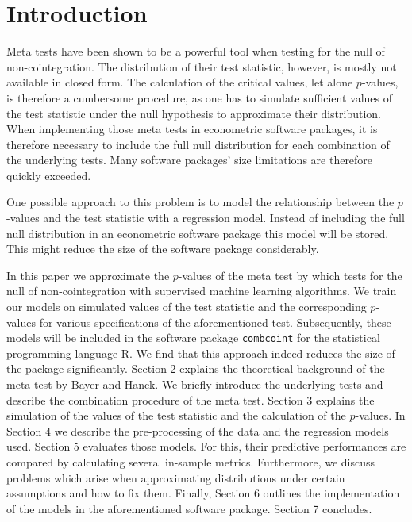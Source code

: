 \documentclass[12pt,a4paper]{article}
\begin{document}
\restoregeometry

\newpage
{} %

\hypertarget{introduction}{%
\section{Introduction}\label{introduction}}

Meta tests have been shown to be a powerful tool when testing for the
null of non-cointegration. The distribution of their test statistic,
however, is mostly not available in closed form. The calculation of the
critical values, let alone \(p\)-values, is therefore a cumbersome
procedure, as one has to simulate sufficient values of the test
statistic under the null hypothesis to approximate their distribution.
When implementing those meta tests in econometric software packages, it
is therefore necessary to include the full null distribution for each
combination of the underlying tests. Many software packages' size
limitations are therefore quickly exceeded.

One possible approach to this problem is to model the relationship
between the \(p\)-values and the test statistic with a regression model.
Instead of including the full null distribution in an econometric
software package this model will be stored. This might reduce the size
of the software package considerably.

In this paper we approximate the \(p\)-values of the meta test by
\textcite{Bayerhanck_2012} which tests for the null of non-cointegration
with supervised machine learning algorithms. We train our models on
simulated values of the test statistic and the corresponding
\(p\)-values for various specifications of the aforementioned test.
Subsequently, these models will be included in the software package
\texttt{combcoint} for the statistical programming language R. We find
that this approach indeed reduces the size of the package significantly.
Section 2 explains the theoretical background of the meta test by Bayer
and Hanck. We briefly introduce the underlying tests and describe the
combination procedure of the meta test. Section 3 explains the
simulation of the values of the test statistic and the calculation of
the \(p\)-values. In Section 4 we describe the pre-processing of the
data and the regression models used. Section 5 evaluates those models.
For this, their predictive performances are compared by calculating
several in-sample metrics. Furthermore, we discuss problems which arise
when approximating distributions under certain assumptions and how to
fix them. Finally, Section 6 outlines the implementation of the models
in the aforementioned software package. Section 7 concludes.
\end{document}
